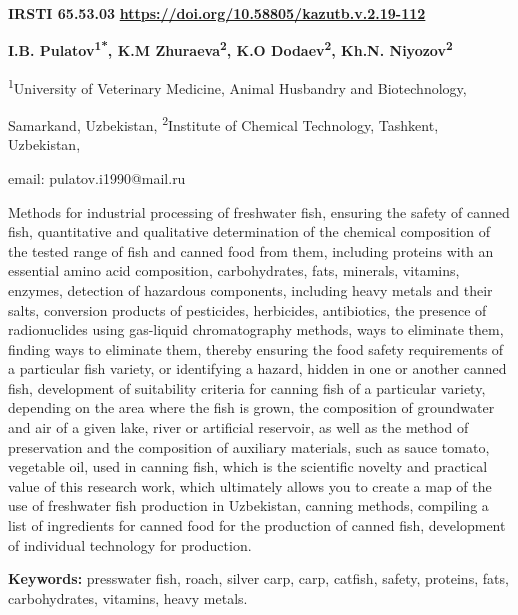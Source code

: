 \clearpage
{\bfseries IRSTI 65.53.03}\hfill
\hfill {\bfseries \href{https://doi.org/10.58805/kazutb.v.2.19-112}{https://doi.org/10.58805/kazutb.v.2.19-112}}


\begin{center}
{\bfseries I.B. Pulatov\textsuperscript{1*}, K.M
Zhuraeva\textsuperscript{2}, K.O Dodaev\textsuperscript{2}, Kh.N.
Niyozov\textsuperscript{2}}

\textsuperscript{1}University of Veterinary Medicine, Animal Husbandry
and Biotechnology,

Samarkand, Uzbekistan, \textsuperscript{2}Institute of Chemical
Technology, Tashkent, Uzbekistan,

email: pulatov.i1990@mail.ru
\end{center}

\hspace{1.5em} Methods for industrial processing of freshwater fish, ensuring the
safety of canned fish, quantitative and qualitative determination of the
chemical composition of the tested range of fish and canned food from
them, including proteins with an essential amino acid composition,
carbohydrates, fats, minerals, vitamins, enzymes, detection of hazardous
components, including heavy metals and their salts, conversion products
of pesticides, herbicides, antibiotics, the presence of radionuclides
using gas-liquid chromatography methods, ways to eliminate them, finding
ways to eliminate them, thereby ensuring the food safety requirements of
a particular fish variety, or identifying a hazard, hidden in one or
another canned fish, development of suitability criteria for canning
fish of a particular variety, depending on the area where the fish is
grown, the composition of groundwater and air of a given lake, river or
artificial reservoir, as well as the method of preservation and the
composition of auxiliary materials, such as sauce tomato, vegetable oil,
used in canning fish, which is the scientific novelty and practical
value of this research work, which ultimately allows you to create a map
of the use of freshwater fish production in Uzbekistan, canning methods,
compiling a list of ingredients for canned food for the production of
canned fish, development of individual technology for production.

{\hspace{1.5em} \bfseries Keywords:} presswater fish, roach, silver carp, carp, catfish,
safety, proteins, fats, carbohydrates, vitamins, heavy metals.


